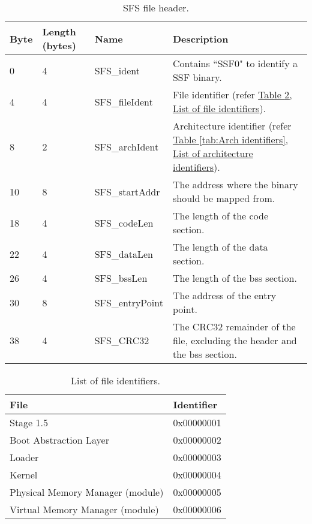 \documentclass[a4paper,oneside]{memoir}
\begin{document}
\begin{table}
    \centering
    \begin{tabular}{ l l l p{4.75cm} }
        \hline
            Byte & Length \small (bytes)    & Name                & Description                                          \\ \hline
            0    & 4                        & SFS\_ident          & Contains ``SSF0" to identify a SSF binary.           \\
            4    & 4                        & SFS\_fileIdent      & File identifier (refer \hyperref[tab:File identifiers]{Table \ref*{tab:File identifiers}, List of file identifiers}). \\
            8    & 2                        & SFS\_archIdent      & Architecture identifier (refer \hyperref[tab:Arch identifiers]{Table \ref*{tab:Arch identifiers}, List of architecture identifiers}). \\
            10   & 8                        & SFS\_startAddr      & The address where the binary should be mapped from.  \\
            18   & 4                        & SFS\_codeLen        & The length of the code section.                      \\
            22   & 4                        & SFS\_dataLen        & The length of the data section.                      \\
            26   & 4                        & SFS\_bssLen         & The length of the bss section.                       \\
            30   & 8                        & SFS\_entryPoint     & The address of the entry point.                      \\
            38   & 4                        & SFS\_CRC32          & The CRC32 remainder of the file, excluding the header and the bss section. \\
        \hline
    \end{tabular}
    \caption{SFS file header. \label{tab:File header}}
\end{table}

\begin{table}
    \centering
    \begin{tabular}{ l l }
        \hline
            File                                      & Identifier  \\ \hline
            Stage 1.5                                 & 0x00000001  \\
            Boot Abstraction Layer                    & 0x00000002  \\
            Loader                                    & 0x00000003  \\
            Kernel                                    & 0x00000004  \\
            Physical Memory Manager (module)          & 0x00000005  \\
            Virtual Memory Manager (module)           & 0x00000006  \\
        \hline
    \end{tabular}
    \caption{List of file identifiers. \label{tab:File identifiers}}
\end{table}
\end{document}
